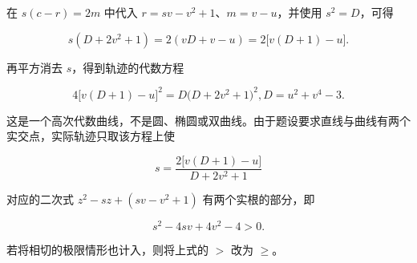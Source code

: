 \begin{answer}
在 $s(c-r)=2m$ 中代入 $r=sv-v^2+1$、$m=v-u$，并使用 $s^2=D$，可得

\nopagebreak[4]
\[
s(D+2v^2+1)=2(vD+v-u)=2\bigl[v(D+1)-u\bigr].
\]

再平方消去 $s$，得到轨迹的代数方程

\nopagebreak[4]
\[
4\bigl[v(D+1)-u\bigr]^2=D\bigl(D+2v^2+1\bigr)^2,
D=u^2+v^4-3.
\]

这是一个高次代数曲线，不是圆、椭圆或双曲线。由于题设要求直线与曲线有两个实交点，实际轨迹只取该方程上使

\nopagebreak[4]
\[
s=\frac{2\bigl[v(D+1)-u\bigr]}{D+2v^2+1}
\]

对应的二次式 $z^2-sz+(sv-v^2+1)$ 有两个实根的部分，即

\nopagebreak[4]
\[
s^2-4sv+4v^2-4>0.
\]

若将相切的极限情形也计入，则将上式的 $>$ 改为 $\ge$。


\end{answer}